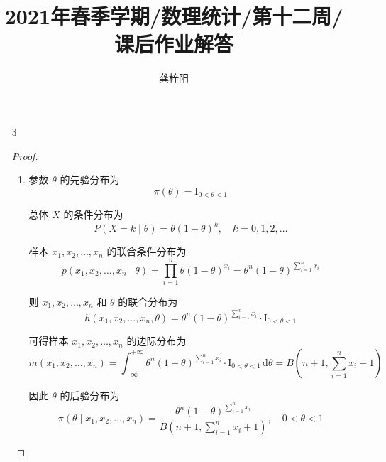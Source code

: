 \documentclass[normal,founder,mtpro2,cn]{elegantnote}
\title{2021年春季学期/数理统计/第十二周/课后作业解答}
\author{龚梓阳}
\date{\zhtoday}
\begin{document}
\maketitle
\begin{enumerate}
    \item[3]
        \begin{proof}
            \begin{enumerate}
                \item
                      参数 $\theta$ 的先验分布为
                      \begin{equation*}
                          \pi(\theta)=\mathrm{I}_{0<\theta<1}
                      \end{equation*}

                      总体 $X$ 的条件分布为
                      \begin{equation*}
                          P(X=k\mid\theta)=\theta(1-\theta)^{k},\quad k=0,1,2,\ldots
                      \end{equation*}

                      样本 $x_{1},x_{2},\ldots,x_{n}$ 的联合条件分布为
                      \begin{equation*}
                          p\left(x_{1},x_{2},\ldots,x_{n}\mid\theta\right)=\prod_{i=1}^{n}\theta(1-\theta)^{x_{i}}=\theta^{n}(1-\theta)^{\sum_{i=1}^{n}x_{i}}
                      \end{equation*}

                      则 $x_{1},x_{2},\ldots,x_{n}$ 和 $\theta$ 的联合分布为
                      \begin{equation*}
                          h\left(x_{1},x_{2},\ldots,x_{n},\theta\right)=\theta^{n}(1-\theta)^{\sum_{i=1}^{n}x_{i}}\cdot\mathrm{I}_{0<\theta<1}
                      \end{equation*}

                      可得样本 $x_{1},x_{2},\ldots,x_{n}$ 的边际分布为
                      \begin{equation*}
                          m(x_{1},x_{2},\ldots,x_{n})=\int_{-\infty}^{+\infty}\theta^{n}(1-\theta)^{\sum_{i=1}^{n}x_{i}}\cdot\mathrm{I}_{0<\theta<1}\,\mathrm{d}\theta=B\left(n+1,\sum_{i=1}^{n}x_{i}+1\right)
                      \end{equation*}

                      因此 $\theta$ 的后验分布为
                      \begin{equation*}
                          \pi\left(\theta\mid x_{1},x_{2},\ldots,x_{n}\right)=\frac{\theta^{n}(1-\theta)^{\sum_{i=1}^{n}x_{i}}}{B\left(n+1,\sum_{i=1}^{n}x_{i}+1\right)},\quad 0<\theta<1
                      \end{equation*}


\end{enumerate}
\end{proof}
\end{enumerate}
\end{document}

